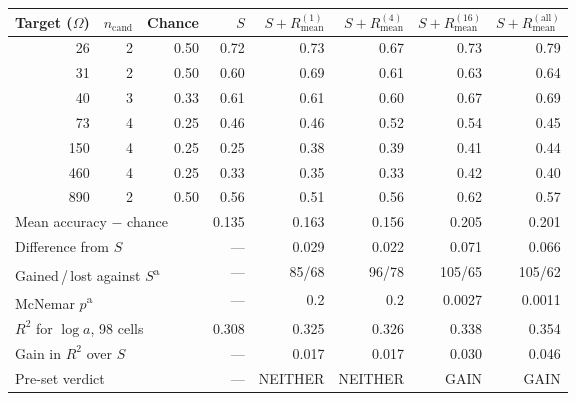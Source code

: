 \begin{tabular}{rrrrrrrr}
\toprule
Target ($\Omega$) & $n_{\mathrm{cand}}$ & Chance & $S$ & $S{+}R_{\mathrm{mean}}^{(1)}$ & $S{+}R_{\mathrm{mean}}^{(4)}$ & $S{+}R_{\mathrm{mean}}^{(16)}$ & $S{+}R_{\mathrm{mean}}^{(\mathrm{all})}$ \\
\midrule
26 & 2 & 0.50 & 0.72 & 0.73 & 0.67 & 0.73 & 0.79 \\
31 & 2 & 0.50 & 0.60 & 0.69 & 0.61 & 0.63 & 0.64 \\
40 & 3 & 0.33 & 0.61 & 0.61 & 0.60 & 0.67 & 0.69 \\
73 & 4 & 0.25 & 0.46 & 0.46 & 0.52 & 0.54 & 0.45 \\
150 & 4 & 0.25 & 0.25 & 0.38 & 0.39 & 0.41 & 0.44 \\
460 & 4 & 0.25 & 0.33 & 0.35 & 0.33 & 0.42 & 0.40 \\
890 & 2 & 0.50 & 0.56 & 0.51 & 0.56 & 0.62 & 0.57 \\
\midrule
\multicolumn{3}{l}{Mean accuracy $-$ chance} & 0.135 & 0.163 & 0.156 & 0.205 & 0.201 \\
\multicolumn{3}{l}{Difference from $S$} & --- & 0.029 & 0.022 & 0.071 & 0.066 \\
\multicolumn{3}{l}{Gained\,/\,lost against $S$\textsuperscript{a}} & --- & 85/68 & 96/78 & 105/65 & 105/62 \\
\multicolumn{3}{l}{McNemar $p$\textsuperscript{a}} & --- & 0.2 & 0.2 & 0.0027 & 0.0011 \\
\midrule
\multicolumn{3}{l}{$R^2$ for $\log a$, 98 cells} & 0.308 & 0.325 & 0.326 & 0.338 & 0.354 \\
\multicolumn{3}{l}{Gain in $R^2$ over $S$} & --- & 0.017 & 0.017 & 0.030 & 0.046 \\
\midrule
\multicolumn{3}{l}{Pre-set verdict} & --- & NEITHER & NEITHER & GAIN & GAIN \\
\bottomrule
\end{tabular}
